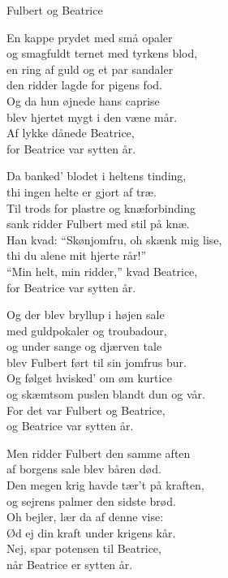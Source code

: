 \begin{song}{Fulbert og Beatrice}
  \begin{SBVerse}
    En kappe prydet med små opaler\\
    og smagfuldt ternet med tyrkens blod,\\
    en ring af guld og et par sandaler\\
    den ridder lagde for pigens fod.\\
    Og da hun øjnede hans caprise\\
    blev hjertet mygt i den væne mår.\\
    Af lykke dånede Beatrice,\\
    for Beatrice var sytten år.
  \end{SBVerse}

  \begin{SBVerse}
    Da banked' blodet i heltens tinding,\\
    thi ingen helte er gjort af træ.\\
    Til trods for plastre og knæforbinding\\
    sank ridder Fulbert med stil på knæ.\\
    Han kvad: ``Skønjomfru, oh skænk mig lise,\\
    thi du alene mit hjerte rår!''\\
    ``Min helt, min ridder,'' kvad Beatrice,\\
    for Beatrice var sytten år.
  \end{SBVerse}

  \begin{SBVerse}
    Og der blev bryllup i højen sale\\
    med guldpokaler og troubadour,\\
    og under sange og djærven tale\\
    blev Fulbert ført til sin jomfrus bur.\\
    Og følget hvisked' om øm kurtice\\
    og skæmtsom puslen blandt dun og vår.\\
    For det var Fulbert og Beatrice,\\
    og Beatrice var sytten år.
  \end{SBVerse}

  \begin{SBVerse}
    Men ridder Fulbert den samme aften\\
    af borgens sale blev båren død.\\
    Den megen krig havde tær't på kraften,\\
    og sejrens palmer den sidste brød.\\
    Oh bejler, lær da af denne vise:\\
    Ød ej din kraft under krigens kår.\\
    Nej, spar potensen til Beatrice,\\
    når Beatrice er sytten år.
  \end{SBVerse}
\end{song}